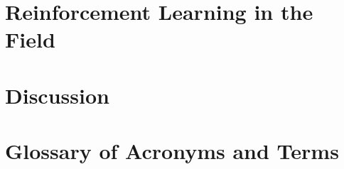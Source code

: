 \section{Reinforcement Learning in the Field}\label{section:field_deployments}


\section{Discussion}\label{section:conclusion}





\appendix
\section{Glossary of Acronyms and Terms}\label{appendix:glossary}



